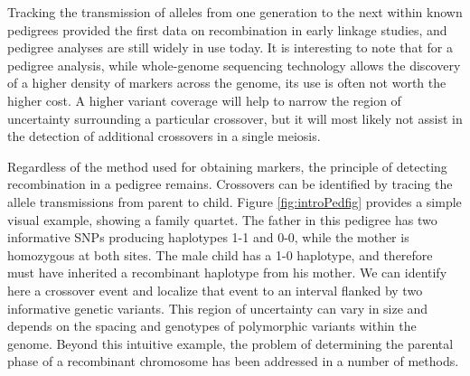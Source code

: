 Tracking the transmission of alleles from one generation to the next within known pedigrees provided the first data on recombination in early linkage studies, and pedigree analyses are still widely in use today.
It is interesting to note that for a pedigree analysis, 
while whole-genome sequencing technology allows the discovery of a higher density of markers across the genome, its use is often not worth the higher cost.
A higher variant coverage will help to narrow the region of uncertainty surrounding a particular crossover, but it will most likely not assist in the detection of additional crossovers in a single meiosis.

Regardless of the method used for obtaining markers, the principle of detecting recombination in a pedigree remains.
Crossovers can be identified by tracing the allele transmissions from parent to child.
Figure \ref{fig:introPedfig} provides a simple visual example, showing a family quartet.
The father in this pedigree has two informative SNPs producing haplotypes 1-1 and 0-0, while the mother is homozygous at both sites.
The male child has a 1-0 haplotype, and therefore must have inherited a recombinant haplotype from his mother.
We can identify here a crossover event and localize that event to an interval flanked by two informative genetic variants.
This region of uncertainty can vary in size and depends on the spacing and genotypes of polymorphic variants within the genome.
Beyond this intuitive example, the problem of determining the parental phase of a recombinant chromosome has been addressed in a number of methods.
%
